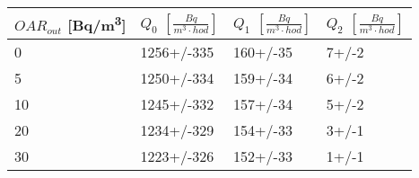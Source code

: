 \begin{tabular}{llll}
\toprule
$OAR_{out}$ [\si{Bq/m^3}] & $Q_0$ $\left[\si{\frac{Bq}{m^3\cdot hod}}\right]$ & $Q_1$ $\left[\si{\frac{Bq}{m^3\cdot hod}}\right]$ & $Q_2$ $\left[\si{\frac{Bq}{m^3\cdot hod}}\right]$ \\
\midrule
0  &                                        1256+/-335 &                                          160+/-35 &                                             7+/-2 \\
5  &                                        1250+/-334 &                                          159+/-34 &                                             6+/-2 \\
10 &                                        1245+/-332 &                                          157+/-34 &                                             5+/-2 \\
20 &                                        1234+/-329 &                                          154+/-33 &                                             3+/-1 \\
30 &                                        1223+/-326 &                                          152+/-33 &                                             1+/-1 \\
\bottomrule
\end{tabular}
